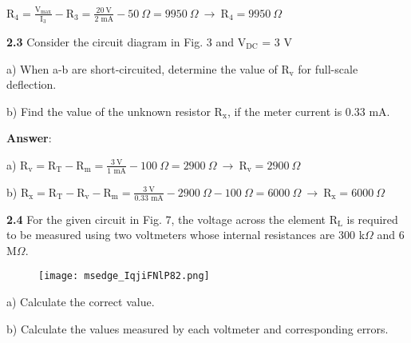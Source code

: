 \documentclass{article}
\begin{document}
\vspace{4mm}

{$\displaystyle \text{R}_\text{4} = \frac{\text{V}_\text{max}}{\text{I}_3} - {\text{R}_3} = \frac{20 \ \text{V}}{2\text{ mA}} - {50 \ \Omega} = 9950 \ \Omega \ \rightarrow \ \boxed{\text{R}_\text{4} =  9950 \ \Omega}$}

\vspace{4mm}

\vspace{8mm}

{\textbf{2.3} Consider the circuit diagram in Fig. 3 and $\text{V}_{\text{DC}}$ = 3 V}

{\quad a) When a-b are short-circuited, determine the value of $\text{R}_\text{v}$ for full-scale deflection.}

{\quad b) Find the value of the unknown resistor $\text{R}_\text{x}$, if the meter current is 0.33 mA.}

\vspace{4mm}

{\textbf{Answer}:}

\vspace{4mm}

{a) $\displaystyle \text{R}_\text{v} = \text{R}_\text{T} - \text{R}_\text{m} = \frac{3 \ \text{V}}{1\text{ mA}} - 100 \ \Omega = 2900 \ \Omega\ \rightarrow \ \boxed{\text{R}_\text{v} =  2900 \ \Omega}$}

\vspace{4mm}

{b) $\displaystyle \text{R}_\text{x} = \text{R}_\text{T}-  \text{R}_\text{v} - \text{R}_\text{m} = \frac{3 \ \text{V}}{0.33\text{ mA}} - 2900 \ \Omega - 100 \ \Omega = 6000 \ \Omega \ \rightarrow \ \boxed{\text{R}_\text{x} =  6000 \ \Omega}$}

\vspace{8mm}

{\textbf{2.4} For the given circuit in Fig. 7, the voltage across the element $\text{R}_{\text{L}}$ is required to be 
measured using two voltmeters whose internal resistances are 300 k$\Omega$ and 6 M$\Omega$.}

\begin{figure}[H]
    \centering
    \texttt{[image: msedge\_IqjiFNlP82.png]}
\end{figure}

{\quad a) Calculate the correct value.}

{\quad b) Calculate the values measured by each voltmeter and corresponding errors.}
\end{document}
